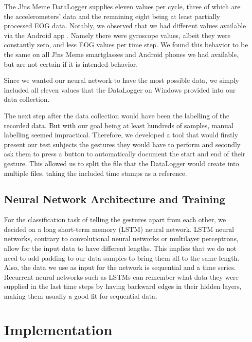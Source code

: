 \documentclass[runningheads]{llncs}
\begin{document}
The J!ns Meme DataLogger supplies eleven values per cycle, three of which are the
accelerometers' data and the remaining eight being at least partially processed EOG data.
Notably, we observed that we had different values available via the Android app
\cite{jinsMemeDataLoggerAndroid}. Namely there were gyroscope values, albeit they
were constantly zero, and less EOG values per time step.
We found this behavior to be the same on all J!ns Meme smartglasses and Android phones
we had available, but are not certain if it is intended behavior.

Since we wanted our neural network to have the most possible data, we simply included all
eleven values that the DataLogger on Windows provided into our data collection.

The next step after the data collection would have been the labelling of the recorded data.
But with our goal being at least hundreds of samples, manual labelling seemed impractical.
Therefore, we developed a tool that would firstly present our test subjects the
gestures they would have to perform and secondly ask them to press a button to
automatically document the start and end of their gesture. This allowed us to split the
file that the DataLogger would create into multiple files, taking the included time
stamps as a reference.

\subsection{Neural Network Architecture and Training} \label{subsec:nnArchAndTraining}
For the classification task of telling the gestures apart from each other, we decided on
a long short-term memory (LSTM) neural network. LSTM neural networks, contrary to convolutional neural networks
or multilayer perceptrons, allow for the input data to have different lengths. This
implies that we do not need to add padding to our data samples to bring them all to the
same length. Also, the data we use as input for the network is sequential and a time
series. Recurrent neural networks such as LSTMs can remember what data they were supplied
in the last time steps by having backward edges in their hidden layers, making them
usually a good fit for sequential data.

\section{Implementation}
\end{document}
